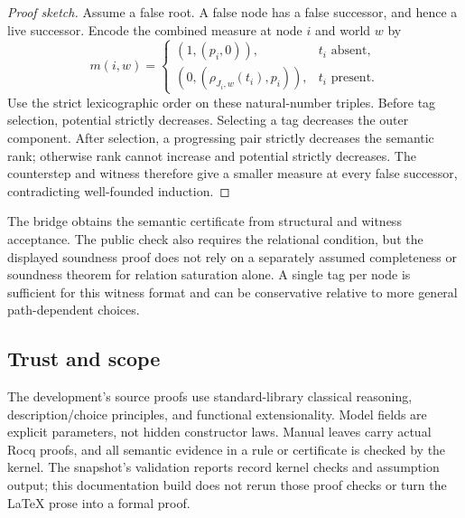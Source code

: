 \begin{proof}[Proof sketch]
Assume a false root. A false node has a false successor, and hence a live
successor. Encode the combined measure at node $i$ and world $w$ by
\[
 m(i,w)=\begin{cases}
 (1,(p_i,0)),&t_i\text{ absent},\\
 (0,(\rho_{J_i,w}(t_i),p_i)),&t_i\text{ present}.
 \end{cases}
\]
Use the strict lexicographic order on these natural-number triples. Before
tag selection, potential strictly decreases. Selecting a tag decreases the
outer component. After selection, a progressing pair strictly decreases the
semantic rank; otherwise rank cannot increase and potential strictly decreases.
The counterstep and witness therefore give a smaller measure at every false
successor, contradicting well-founded induction.
\end{proof}

The bridge obtains the semantic certificate from structural and witness
acceptance. The public check also requires the relational condition, but
the displayed soundness proof does not rely on a separately assumed
completeness or soundness theorem for relation saturation alone. A single
tag per node is sufficient for this witness format and can be conservative
relative to more general path-dependent choices.

\subsection{Trust and scope}
The development's source proofs use standard-library classical reasoning,
description/choice principles, and functional extensionality. Model fields
are explicit parameters, not hidden constructor laws. Manual leaves carry
actual Rocq proofs, and all semantic evidence in a rule or certificate is
checked by the kernel. The snapshot's validation reports record kernel
checks and assumption output; this documentation build does not rerun those
proof checks or turn the LaTeX prose into a formal proof.
